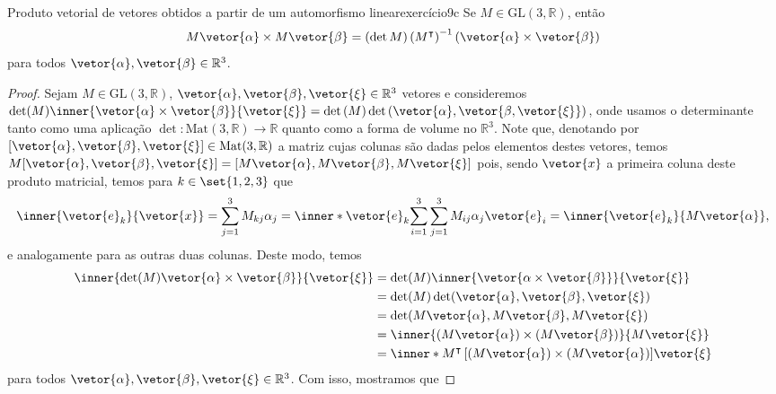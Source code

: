\begin{lemma}{Produto vetorial de vetores obtidos a partir de um automorfismo linear}{exercício9c}
    Se \(M \in \mathrm{GL}(3, \mathbb{R})\), então
    \begin{equation*}
        M\vetor{\alpha}\times M\vetor{\beta} = (\det{M})\left(M^\intercal\right)^{-1}(\vetor{\alpha} \times \vetor{\beta})
    \end{equation*}
    para todos \(\vetor{\alpha},\vetor{\beta} \in \mathbb{R}^3\).
\end{lemma}
\begin{proof}
    Sejam \(M \in \mathrm{GL}(3, \mathbb{R})\), \(\vetor{\alpha}, \vetor{\beta}, \vetor{\xi} \in \mathbb{R}^3\) vetores e consideremos \(\det(M)\inner{\vetor{\alpha}\times\vetor{\beta}}{\vetor{\xi}} = \det{(M)} \det{(\vetor{\alpha},\vetor{\beta, \vetor{\xi}})}\), onde usamos o determinante tanto como uma aplicação \(\det : \mathrm{Mat}(3, \mathbb{R}) \to \mathbb{R}\) quanto como a forma de volume no \(\mathbb{R}^3\). Note que, denotando por \([\vetor{\alpha}, \vetor{\beta}, \vetor{\xi}] \in \mathrm{Mat}(3, \mathbb{R})\) a matriz cujas colunas são dadas pelos elementos destes vetores, temos \(M[\vetor{\alpha}, \vetor{\beta}, \vetor{\xi}] = [M\vetor{\alpha}, M\vetor{\beta}, M\vetor{\xi}]\) pois, sendo \(\vetor{x}\) a primeira coluna deste produto matricial, temos para \(k \in \set{1,2,3}\) que
    \begin{equation*}
        \inner{\vetor{e}_k}{\vetor{x}} = \sum_{j = 1}^3 M_{kj}\alpha_j = \inner*{\vetor{e}_k}{\sum_{i = 1}^3\sum_{j = 1}^3 M_{ij} \alpha_j \vetor{e}_i} = \inner{\vetor{e}_k}{M\vetor{\alpha}},
    \end{equation*}
    e analogamente para as outras duas colunas. Deste modo, temos
    \begin{align*}
        \inner{\det(M)\vetor{\alpha}\times \vetor{\beta}}{\vetor{\xi}}
        &= \det(M)\inner{\vetor{\alpha\times \vetor{\beta}}}{\vetor{\xi}}\\
        &= \det(M) \det(\vetor{\alpha}, \vetor{\beta}, \vetor{\xi})\\
        &= \det(M\vetor{\alpha}, M\vetor{\beta}, M\vetor{\xi})\\
        &= \inner{(M\vetor{\alpha})\times (M\vetor{\beta})}{M\vetor{\xi}}\\
        &= \inner*{M^\intercal\left[(M\vetor{\alpha}) \times (M\vetor{\alpha})\right]}{\vetor{\xi}}
    \end{align*}
    para todos \(\vetor{\alpha}, \vetor{\beta}, \vetor{\xi} \in \mathbb{R}^3\). Com isso, mostramos que

\end{proof}
